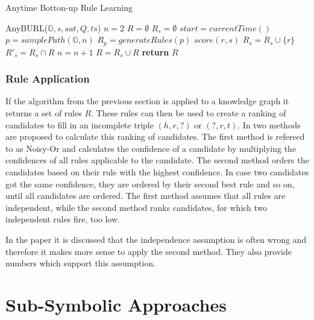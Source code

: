 \begin{algorithm}[H]
\caption{Anytime Botton-up Rule Learning}
\label{alg:anyburl}
\begin{algorithmic}[1]
\STATEx AnyBURL($\mathbb{G},s,sat,Q,ts$)
\STATE $n=2$
\STATE $R=\emptyset$
\LOOP
\STATE $R_s=\emptyset$
\STATE $start=currentTime()$
\REPEAT
\STATE $p=samplePath(\mathbb{G},n)$
\STATE $R_p=generateRules(p)$
\STATE $score(r,s)$
\STATE $R_s=R_s \cup \{r\}$
\ENDIF
\ENDFOR
{}
\STATE ${R'}_s = R_s \cap R$
\STATE $n=n+1$
\ENDIF 
\STATE $R=R_s \cup R$
\ENDLOOP
\STATE \textbf{return} $R$
\end{algorithmic}
\end{algorithm}

\subsubsection{Rule Application}
If the algorithm from the previous section is applied to a knowledge graph it returns a set of rules $R$. These rules can then be used to create a ranking of candidates to fill in an incomplete triple $(h,r,?)$ or $(?,r,t)$. In \cite{meilicke_anytime_2019} two methods are proposed to calculate this ranking of candidates. 
The first method is refereed to as Noisy-Or and calculates the confidence of a candidate by multiplying the confidences of all rules applicable to the candidate. 
The second method orders the candidates based on their rule with the highest confidence. In case two candidates got the same confidence, they are ordered by their second best rule and so on, until all candidates are ordered. 
The first method assumes that all rules are independent, while the second method ranks candidates, for which two independent rules fire, too low. 

In the paper it is discussed that the independence assumption is often wrong and therefore it makes more sense to apply the second method. They also provide numbers which support this assumption. 

\section{Sub-Symbolic Approaches}
\label{cha:sub_symbolic_methods}

